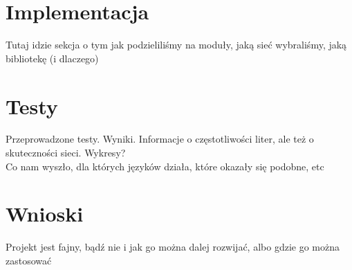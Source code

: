 \documentclass[journal]{IEEEtran}
\begin{document}
%




\section{Implementacja}
Tutaj idzie sekcja o tym jak podzieliliśmy na moduły, jaką sieć wybraliśmy, jaką bibliotekę (i dlaczego)



\section{Testy}
Przeprowadzone testy. Wyniki. Informacje o częstotliwości liter, ale też o skuteczności sieci. Wykresy? \\
Co nam wyszło, dla których języków działa, które okazały się podobne, etc



\section{Wnioski}
Projekt jest fajny, bądź nie i jak go można dalej rozwijać, albo gdzie go można zastosować
\end{document}
